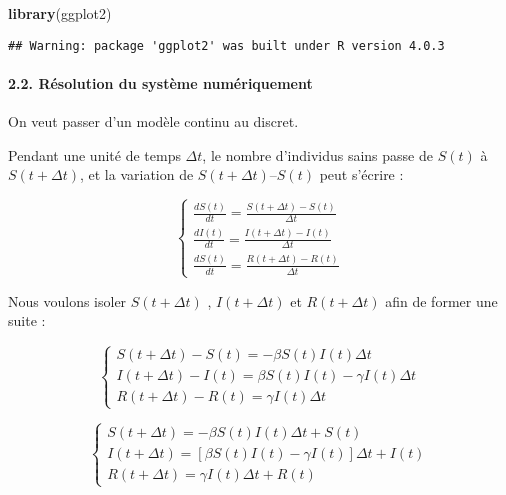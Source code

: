 \documentclass[
]{article}
\newenvironment{Shaded}{\begin{snugshade}}{\end{snugshade}}
\newcommand{\KeywordTok}[1]{\textcolor[rgb]{0.13,0.29,0.53}{\textbf{#1}}}
\newcommand{\NormalTok}[1]{#1}
\begin{document}
\begin{Shaded}
\begin{Highlighting}[]
\KeywordTok{library}\NormalTok{(ggplot2)}
\end{Highlighting}
\end{Shaded}

\begin{verbatim}
## Warning: package 'ggplot2' was built under R version 4.0.3
\end{verbatim}

\hypertarget{ruxe9solution-du-systuxe8me-numuxe9riquement}{%
\paragraph{2.2. Résolution du système
numériquement}\label{ruxe9solution-du-systuxe8me-numuxe9riquement}}

On veut passer d'un modèle continu au discret.

Pendant une unité de temps \(\Delta t\), le nombre d'individus sains
passe de \(S(t)\) à \(S(t + \Delta t)\), et la variation de
\(S(t + \Delta t)–S(t)\) peut s'écrire :

\[\begin{equation}
    \left\{
     \begin{array}{l}
        \frac{dS(t)}{dt} = \frac{S(t + \Delta t)-S(t)}{\Delta t} \\
        \frac{dI(t)}{dt} = \frac{I(t + \Delta t) -I(t)}{\Delta t}  \\
        \frac{dS(t)}{dt} = \frac{R(t + \Delta t) -R(t)}{\Delta t} 
      \end{array}
    \right.
\end{equation}\]

Nous voulons isoler \(S(t + \Delta t)\) , \(I(t + \Delta t)\) et
\(R(t + \Delta t)\) afin de former une suite :

\[\begin{equation}
    \left\{
     \begin{array}{l}
        S(t + \Delta t) -S(t) = - \beta S(t)  I(t) \Delta t\\
        I(t + \Delta t) -I(t) = \beta S(t)  I(t) - \gamma  I(t) \Delta t\\
        R(t + \Delta t) -R(t) = \gamma I(t) \Delta t
      \end{array}
    \right.
\end{equation}\]

\[\begin{equation}
    \left\{
     \begin{array}{l}
        S(t + \Delta t)  = - \beta S(t)  I(t) \Delta t +S(t)\\
        I(t + \Delta t)  = [\beta S(t)  I(t) - \gamma  I(t)] \Delta t + I(t)\\
        R(t + \Delta t)  = \gamma I(t) \Delta t +R(t)
      \end{array}
    \right.
\end{equation}\]
\end{document}
